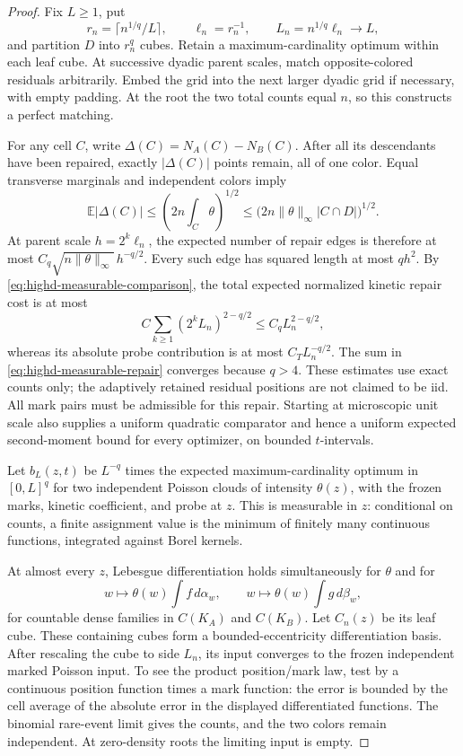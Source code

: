 \documentclass[11pt,reqno]{amsart}
\theoremstyle{definition}
\theoremstyle{remark}
\numberwithin{equation}{section}
\newcommand{\E}{\mathbb E}
\begin{document}
\begin{proof}
Fix \(L\ge1\), put
\[
 r_n=\lceil n^{1/q}/L\rceil,\qquad
 \ell_n=r_n^{-1},\qquad L_n=n^{1/q}\ell_n\longrightarrow L,
\]
and partition \(D\) into \(r_n^q\) cubes. Retain a
maximum-cardinality optimum within each leaf cube. At successive
dyadic parent scales, match opposite-colored residuals arbitrarily.
Embed the grid into the next larger dyadic grid if necessary, with
empty padding. At the root the two total counts equal \(n\), so this
constructs a perfect matching.

For any cell \(C\), write \(\Delta(C)=N_A(C)-N_B(C)\).
After all its descendants have been repaired, exactly
\(|\Delta(C)|\) points remain, all of one color. Equal transverse
marginals and independent colors imply
\begin{equation}
\label{eq:highd-measurable-count}
 \E|\Delta(C)|
 \le\left(2n\int_C\theta\right)^{1/2}
 \le\bigl(2n\|\theta\|_\infty|C\cap D|\bigr)^{1/2}.
\end{equation}
At parent scale \(h=2^k\ell_n\), the expected number of repair
edges is therefore at most
\(C_q\sqrt{n\|\theta\|_\infty}\,h^{-q/2}\).
Every such edge has squared length at most \(qh^2\). By
\eqref{eq:highd-measurable-comparison}, the total expected normalized
kinetic repair cost is at most
\begin{equation}
\label{eq:highd-measurable-repair}
 C\sum_{k\ge1}(2^kL_n)^{2-q/2}
             \le C_q L_n^{2-q/2},
\end{equation}
whereas its absolute probe contribution is at most
\(C_TL_n^{-q/2}\). The sum in
\eqref{eq:highd-measurable-repair} converges because \(q>4\).
These estimates use exact counts only; the adaptively retained
residual positions are not claimed to be iid. All mark pairs must
be admissible for this repair. Starting at microscopic unit scale
also supplies a uniform quadratic comparator and hence a uniform
expected second-moment bound for every optimizer, on bounded
\(t\)-intervals.

Let \(b_L(z,t)\) be \(L^{-q}\) times the expected
maximum-cardinality optimum in \([0,L]^q\) for two independent
Poisson clouds of intensity \(\theta(z)\), with the frozen marks,
kinetic coefficient, and probe at \(z\). This is measurable in
\(z\): conditional on counts, a finite assignment value is the
minimum of finitely many continuous functions, integrated against
Borel kernels.

At almost every \(z\), Lebesgue differentiation holds simultaneously
for \(\theta\) and for
\[
 w\longmapsto\theta(w)\int f\,d\alpha_w,
 \qquad
 w\longmapsto\theta(w)\int g\,d\beta_w,
\]
for countable dense families in \(C(K_A)\) and \(C(K_B)\).
Let \(C_n(z)\) be its leaf cube. These containing cubes form a
bounded-eccentricity differentiation basis. After rescaling the cube
to side \(L_n\), its input converges to the frozen independent
marked Poisson input. To see the product position/mark law, test by
a continuous position function times a mark function: the error is
bounded by the cell average of the absolute error in the displayed
differentiated functions. The binomial rare-event limit gives the
counts, and the two colors remain independent. At zero-density
roots the limiting input is empty.


\end{proof}
\end{document}

